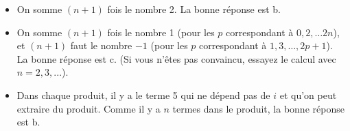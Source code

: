 \documentclass[11pt, a4paper]{article}
\begin{document}
\begin{itemize}
\item On somme $(n+1)$ fois le nombre 2. La bonne réponse est b.
\item On somme $(n+1)$ fois le nombre 1 (pour les $p$ correspondant à $0,2,\dots 2n$), et $(n+1)$ faut le nombre $-1$ (pour les $p$ correspondant à $1,3,\dots,2p+1$). La bonne réponse est c. (Si vous n'êtes pas convaincu, essayez le calcul avec $n=2,3,...$).
\item Dans chaque produit, il y a le terme 5 qui ne dépend pas de $i$ et qu'on peut extraire du produit. Comme il y a $n$ termes dans le produit, la bonne réponse est b.
\end{itemize}
\end{document}
